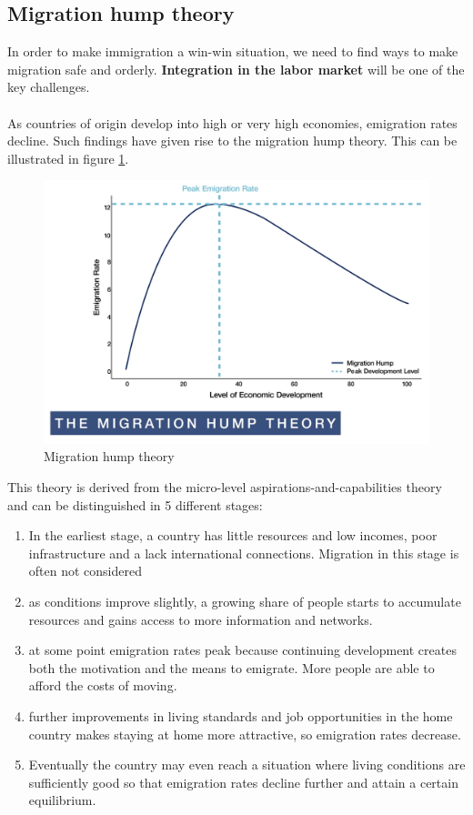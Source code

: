 \documentclass[../summary.tex]{subfiles}
\begin{document}
 	\subsection{Migration hump theory}
 	In order to make immigration a win-win situation, we need to find ways to make migration safe and orderly. \textbf{Integration in the labor market} will be one of the key challenges.
 	\\
 	\\
 	As countries of origin develop into  high or very high economies, emigration rates decline.  Such findings have given rise
 	to the migration hump theory. This can be illustrated in figure \ref{fig:7-hump}.
 	\begin{figure}[h]
 		\centering
 		\includegraphics[width=0.7\linewidth]{../images/7-hump}
 		\caption{Migration hump theory}
 		\label{fig:7-hump}
 	\end{figure}
 	This theory is derived from the micro-level aspirations-and-capabilities theory and can be distinguished in 5 different stages:
 	\begin{enumerate}
 		\item  In the earliest stage, a country has little resources and low incomes, poor infrastructure and a lack international connections. Migration in this stage is often not considered
		\item	as conditions improve slightly, a growing share of people starts to accumulate resources and gains access to more information and networks.
		\item  	at some point emigration
		rates peak because continuing development creates both the motivation and the means to emigrate. More people are able to afford the costs of moving.
		\item further improvements in living standards and job opportunities in the home country makes staying at home more attractive, so emigration rates decrease.
		\item Eventually the country may even reach a situation where living conditions are sufficiently good so that emigration rates decline further and attain a certain equilibrium.
 	\end{enumerate}
 	
\end{document}
